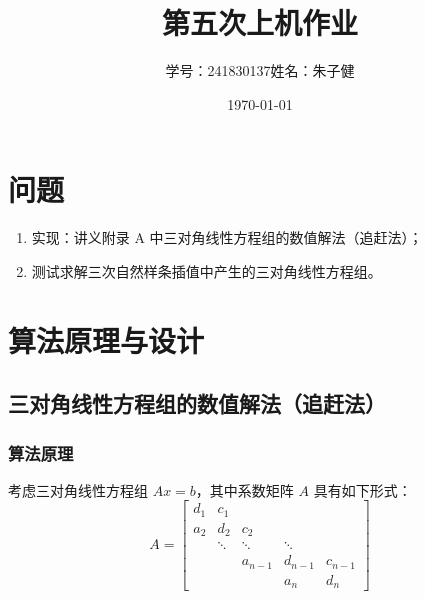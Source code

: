 \documentclass{article}
\title{第五次上机作业}
\author{学号：241830137\quad 姓名：朱子健}
\date{\today}
\begin{document}
\maketitle

\section{问题}
\begin{enumerate}[1.]
    \item 实现：讲义附录 A 中三对角线性方程组的数值解法（追赶法）；
    \item 测试求解三次自然样条插值中产生的三对角线性方程组。
\end{enumerate}

\section{算法原理与设计}
\subsection{三对角线性方程组的数值解法（追赶法）}
\subsubsection{算法原理}
考虑三对角线性方程组 $Ax = b$，其中系数矩阵 $A$ 具有如下形式：
\begin{equation}
A = \begin{bmatrix}
d_1 & c_1 & & & \\
a_2 & d_2 & c_2 & & \\
& \ddots & \ddots & \ddots & \\
& & a_{n-1} & d_{n-1} & c_{n-1} \\
& & & a_n & d_n
\end{bmatrix}
\end{equation}
\end{document}
